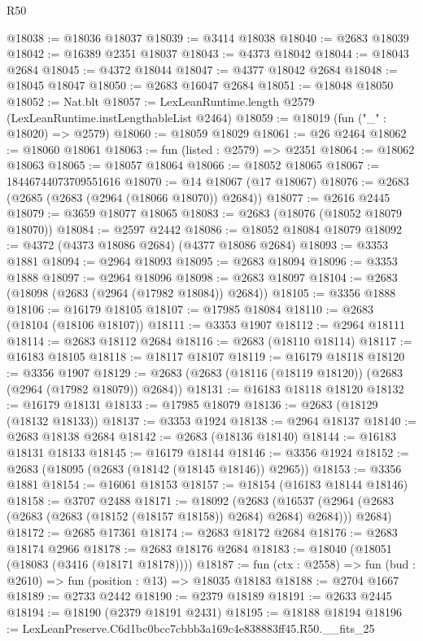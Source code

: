 \begin{lexlean}{R50}
\begin{coremodule}
@18038 := @18036 @18037
@18039 := @3414 @18038
@18040 := @2683 @18039
@18042 := @16389 @2351 @18037
@18043 := @4373 @18042
@18044 := @18043 @2684
@18045 := @4372 @18044
@18047 := @4377 @18042 @2684
@18048 := @18045 @18047
@18050 := @2683 @16047 @2684
@18051 := @18048 @18050
@18052 := Nat.blt
@18057 := LexLeanRuntime.length @2579 (LexLeanRuntime.instLengthableList @2464)
@18059 := @18019 (fun ("_" : @18020) => @2579)
@18060 := @18059 @18029
@18061 := @26 @2464
@18062 := @18060 @18061
@18063 := fun (listed : @2579) => @2351
@18064 := @18062 @18063
@18065 := @18057 @18064
@18066 := @18052 @18065
@18067 := 18446744073709551616
@18070 := @14 @18067 (@17 @18067)
@18076 := @2683 (@2685 (@2683 (@2964 (@18066 @18070)) @2684))
@18077 := @2616 @2445
@18079 := @3659 @18077 @18065
@18083 := @2683 (@18076 (@18052 @18079 @18070))
@18084 := @2597 @2442
@18086 := @18052 @18084 @18079
@18092 := @4372 (@4373 @18086 @2684) (@4377 @18086 @2684)
@18093 := @3353 @1881
@18094 := @2964 @18093
@18095 := @2683 @18094
@18096 := @3353 @1888
@18097 := @2964 @18096
@18098 := @2683 @18097
@18104 := @2683 (@18098 (@2683 (@2964 (@17982 @18084)) @2684))
@18105 := @3356 @1888
@18106 := @16179 @18105
@18107 := @17985 @18084
@18110 := @2683 (@18104 (@18106 @18107))
@18111 := @3353 @1907
@18112 := @2964 @18111
@18114 := @2683 @18112 @2684
@18116 := @2683 (@18110 @18114)
@18117 := @16183 @18105
@18118 := @18117 @18107
@18119 := @16179 @18118
@18120 := @3356 @1907
@18129 := @2683 (@2683 (@18116 (@18119 @18120)) (@2683 (@2964 (@17982 @18079)) @2684))
@18131 := @16183 @18118 @18120
@18132 := @16179 @18131
@18133 := @17985 @18079
@18136 := @2683 (@18129 (@18132 @18133))
@18137 := @3353 @1924
@18138 := @2964 @18137
@18140 := @2683 @18138 @2684
@18142 := @2683 (@18136 @18140)
@18144 := @16183 @18131 @18133
@18145 := @16179 @18144
@18146 := @3356 @1924
@18152 := @2683 (@18095 (@2683 (@18142 (@18145 @18146)) @2965))
@18153 := @3356 @1881
@18154 := @16061 @18153
@18157 := @18154 (@16183 @18144 @18146)
@18158 := @3707 @2488
@18171 := @18092
    (@2683
      (@16537 (@2964 (@2683 (@2683 (@2683 (@18152 (@18157 @18158)) @2684) @2684) @2684)))
      @2684)
@18172 := @2685 @17361
@18174 := @2683 @18172 @2684
@18176 := @2683 @18174 @2966
@18178 := @2683 @18176 @2684
@18183 := @18040 (@18051 (@18083 (@3416 (@18171 @18178))))
@18187 := fun (ctx : @2558) => fun (bud : @2610) => fun (position : @13) => @18035 @18183
@18188 := @2704 @1667
@18189 := @2733 @2442
@18190 := @2379 @18189
@18191 := @2633 @2445
@18194 := @18190 (@2379 @18191 @2431)
@18195 := @18188 @18194
@18196 := LexLeanPreserve.C6d1bc0bcc7cbbb3a169c4e838883ff45.R50.__fits_25

\end{coremodule}
\end{lexlean}
